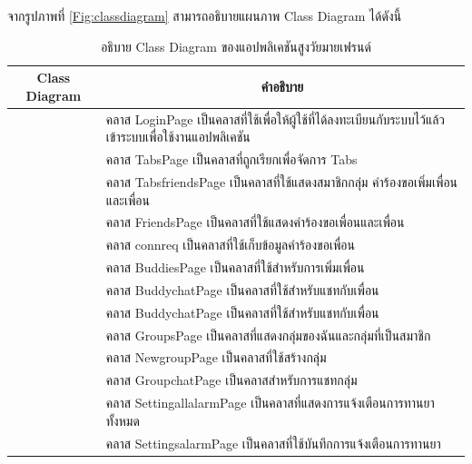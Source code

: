 	จากรูปภาพที่ \ref{Fig:classdiagram} สามารถอธิบายแผนภาพ Class Diagram ได้ดังนี้
	\begin{table}[H]
		\centering
		\caption{อธิบาย Class Diagram ของแอปพลิเคชันสูงวัยมายเฟรนด์}
		\label{tab:class}
		\begin{tabular}{|c|p{10cm}|}
			\hline
			\textbf{Class Diagram} & \multicolumn{1}{c|}{\textbf{คำอธิบาย}} \\ \hline
			\raisebox{-\totalheight}{LoginPage}
			& \setstretch{1.5} {คลาส LoginPage เป็นคลาสที่ใช้เพื่อให้ผู้ใช้ที่ได้ลงทะเบียนกับระบบไว้แล้วเข้าระบบเพื่อใช้งานแอปพลิเคชัน } \\ \hline
			\raisebox{-\totalheight}{TabsPage}
			& \setstretch{1.5} {คลาส TabsPage เป็นคลาสที่ถูกเรียกเพื่อจัดการ Tabs} \\ \hline
			\raisebox{-\totalheight}{TabsfriendsPage}
			& \setstretch{1.5} {คลาส TabsfriendsPage เป็นคลาสที่ใช้แสดงสมาชิกกลุ่ม คำร้องขอเพิ่มเพื่อนและเพื่อน} \\ \hline
			\raisebox{-\totalheight}{FriendsPage}
			& \setstretch{1.5} {คลาส FriendsPage เป็นคลาสที่ใช้แสดงคำร้องขอเพื่อนและเพื่อน} \\ \hline
			\raisebox{-\totalheight}{connreq}
			& \setstretch{1.5} {คลาส connreq เป็นคลาสที่ใช้เก็บข้อมูลคำร้องขอเพื่อน} \\ \hline
			\raisebox{-\totalheight}{BuddiesPage}
			& \setstretch{1.5} {คลาส BuddiesPage เป็นคลาสที่ใช้สำหรับการเพิ่มเพื่อน} \\ \hline
			\raisebox{-\totalheight}{BuddychatPage}
			& \setstretch{1.5} {คลาส BuddychatPage เป็นคลาสที่ใช้สำหรับแชทกับเพื่อน} \\ \hline
			\raisebox{-\totalheight}{BuddychatPage}
			& \setstretch{1.5} {คลาส BuddychatPage เป็นคลาสที่ใช้สำหรับแชทกับเพื่อน} \\ \hline
			\raisebox{-\totalheight}{GroupsPage}
			& \setstretch{1.5} {คลาส GroupsPage เป็นคลาสที่แสดงกลุ่มของฉันและกลุ่มที่เป็นสมาชิก} \\ \hline
			\raisebox{-\totalheight}{NewgroupPage}
			& \setstretch{1.5} {คลาส NewgroupPage เป็นคลาสที่ใช้สร้างกลุ่ม} \\ \hline
			\raisebox{-\totalheight}{GroupchatPage}
			& \setstretch{1.5} {คลาส GroupchatPage เป็นคลาสสำหรับการแชทกลุ่ม} \\ \hline
			\raisebox{-\totalheight}{SettingallalarmPage}
			& \setstretch{1.5} {คลาส SettingallalarmPage เป็นคลาสที่แสดงการแจ้งเตือนการทานยาทั้งหมด} \\ \hline
			\raisebox{-\totalheight}{SettingsalarmPage}
			& \setstretch{1.5} {คลาส SettingsalarmPage เป็นคลาสที่ใช้บันทึกการแจ้งเตือนการทานยา} \\ \hline
	\end{tabular}
\end{table}

